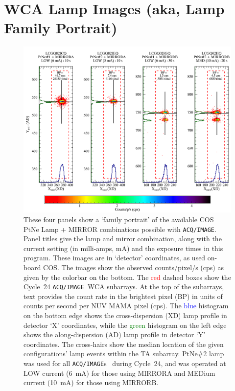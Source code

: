 \documentclass{stsci_report}
\newcommand{\tacq}[1]{\texttt{ACQ/#1}}
\begin{document}
\vspace{-0.3cm}
\section{WCA Lamp Images (aka, Lamp Family Portrait) \label{sec:family_portrait} }
\vspace{-0.3cm}

\begin{figure}[htb]
\vspace{1.3cm}
\centering
\includegraphics[width=\textwidth]{png/C21_13526_FP.png}
\caption{These four panels show a `family portrait' of the available COS PtNe Lamp + MIRROR combinations possible with \tacq{IMAGE}. Panel titles give the lamp and mirror combination, along with the current setting (in milli-amps, mA) and the exposure times in this program.
These images are in `detector' coordinates, as used on-board COS.
The images show the observed counts/pixel/s (cps) as given by the colorbar on the bottom.
The \textcolor{red}{red} dashed boxes show the Cycle~24 \tacq{IMAGE}~WCA subarrays. At the top of the subarrays, text provides the count rate in the brightest pixel (BP) in units of counts per second per NUV MAMA pixel (cps).
The \textcolor{blue}{blue} histogram on the bottom edge shows the cross-dispersion (XD) lamp profile in detector `X' coordinates, while
the \textcolor{green}{green} histogram on the left edge shows the along-dispersion (AD) lamp profile in detector `Y' coordinates.
The cross-hairs show the median location of the given configurations' lamp events within the TA subarray.
PtNe\#2 lamp was used for all \tacq{IMAGE}s~ during Cycle~24, and was operated at LOW current (6~mA) for those using MIRRORA and MEDium current (10~mA) for those using MIRRORB.
}
\label{fig:FP}
\vspace{1.3cm}
\end{figure}
\end{document}
